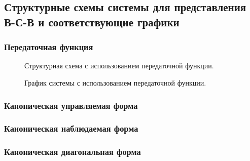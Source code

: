 \documentclass[a5paper, 10pt]{article}
\theoremstyle{definition}
\theoremstyle{plain}
\theoremstyle{remark}
\begin{document}
\subsection{Структурные схемы системы для представления В-С-В и соответствующие графики}

\subsubsection{Передаточная функция}

\begin{figure}[h]
\caption{Структурная схема с использованием передаточной функции.}
\end{figure}

\begin{figure}[h]
\caption{График системы с использованием передаточной функции.}
\end{figure}

\subsubsection{Каноническая управляемая форма}


\subsubsection{Каноническая наблюдаемая форма}


\subsubsection{Каноническая диагональная форма}
\end{document}
